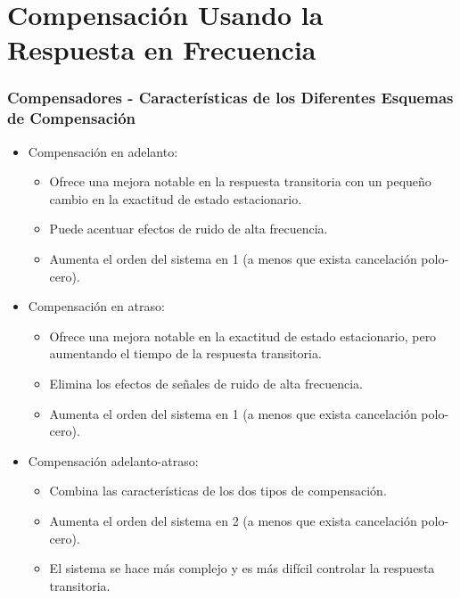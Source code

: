 \documentclass[aspectratio=169, handout]{beamer}
\theoremstyle{definition}
\theoremstyle{plain}
\theoremstyle{remark}
\begin{document}
\section{Compensación Usando la Respuesta en Frecuencia}
\begin{frame}[<+->]\frametitle{Compensadores - Características de los Diferentes Esquemas de Compensación}
 	\begin{itemize}
 		\item Compensación en adelanto:
 		\begin{itemize}
 			\item Ofrece una mejora notable en la respuesta transitoria con un pequeño cambio en la exactitud de estado estacionario.
 			\item Puede acentuar efectos de ruido de alta frecuencia.
 			\item Aumenta el orden del sistema en 1 (a menos que exista cancelación polo-cero).
 		\end{itemize}
 		\item Compensación en atraso:
 		\begin{itemize}
 			\item Ofrece una mejora notable en la exactitud de estado estacionario, pero aumentando el tiempo de la respuesta transitoria.
 			\item Elimina los efectos de señales de ruido de alta frecuencia.
 			\item Aumenta el orden del sistema en 1 (a menos que exista cancelación polo-cero).
 		\end{itemize}
 		\item Compensación adelanto-atraso:
 		\begin{itemize}
 			\item Combina las características de los dos tipos de compensación.
 			\item Aumenta el orden del sistema en 2 (a menos que exista cancelación polo-cero).
 			\item El sistema se hace más complejo y es más difícil controlar la respuesta transitoria.
 		\end{itemize}
  \end{itemize}    
\end{frame}
\end{document}
